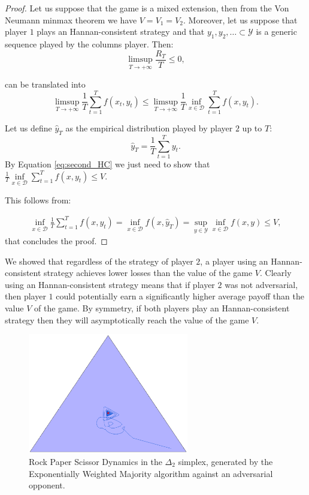 \begin{proof}
    Let us suppose that the game is a mixed extension, then from the Von Neumann minmax theorem we have $V=V_1=V_2$.
    Moreover, let us suppose that player $1$ plays an Hannan-consistent strategy and that $y_1,y_2,\ldots \subset \mathcal Y$ is a generic sequence played by the columns player. Then:
    \begin{equation}
        \limsup\limits_{T\to+\infty}\frac{R_T}{T}\le0,
    \end{equation}
    
    can be translated into 
    \begin{equation}\label{eq:second_HC}
        \limsup\limits_{T\to+\infty}\frac{1}{T}\sum\limits_{t=1}^Tf(x_t,y_t)\le\limsup\limits_{T\to+\infty}\frac{1}{T}\inf\limits_{x\in\mathcal D}\sum\limits_{t=1}^Tf(x,y_t).
    \end{equation}

    Let us define $\hat y_T$ as the empirical distribution played by player $2$ up to $T$:
    $$\hat y_T=\frac{1}{T}\sum\limits_{t=1}^Ty_t.$$
    By Equation \eqref{eq:second_HC} we just need to show that $\frac{1}{T}\inf\limits_{x\in \mathcal D} \sum\limits_{t=1}^T f(x,y_t)\le V.$

    This follows from:

    \begin{align}
        \inf\limits_{x\in\mathcal D}\frac{1}{T}\sum\limits_{t=1}^T f(x,y_t)=\inf\limits_{x\in\mathcal D} f(x,\hat y_T)=\sup\limits_{y\in\mathcal Y}\inf\limits_{x\in\mathcal D} f(x,y)\le V,
    \end{align}
    that concludes the proof.
\end{proof}

We showed that regardless of the strategy of player $2$, a player using an Hannan-consistent strategy achieves lower losses than the value of the game $V$. Clearly using an Hannan-consistent strategy means that if player $2$ was not adversarial, then player $1$ could potentially earn a significantly higher average payoff than the value $V$ of the game. By symmetry, if both players play an Hannan-consistent strategy then they will asymptotically reach the value of the game $V$.

\begin{figure}[!ht]
    \centering
    \includegraphics[width=7cm]{./img/rps_ewm.eps}
\caption{Rock Paper Scissor Dynamics in the $\Delta_2$ simplex, generated by the Exponentially Weighted Majority algorithm against an adversarial opponent.}
\label{fig:RPS}
\end{figure}

